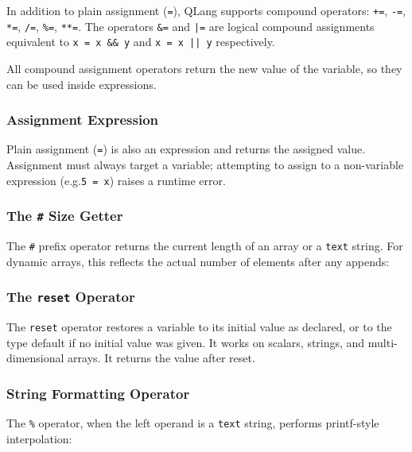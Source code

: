 In addition to plain assignment (\texttt{=}), QLang supports compound
operators: \texttt{+=}, \texttt{-=}, \texttt{*=}, \texttt{/=}, \texttt{\%=},
\texttt{**=}. The operators \texttt{\&=} and \texttt{|=} are logical compound
assignments equivalent to \texttt{x = x \&\& y} and \texttt{x = x || y}
respectively.

All compound assignment operators return the new value of the variable,
so they can be used inside expressions.

\subsubsection{Assignment Expression}

Plain assignment (\texttt{=}) is also an expression and returns the assigned
value. Assignment must always target a variable; attempting to assign to a
non-variable expression (e.g.\@ \texttt{5 = x}) raises a runtime error.

\subsubsection{The \texttt{\#} Size Getter}

The \texttt{\#} prefix operator returns the current length of an array or a
\texttt{text} string. For dynamic arrays, this reflects the actual number of
elements after any appends:



\newpage
\subsubsection{The \texttt{reset} Operator}

The \texttt{reset} operator restores a variable to its initial value as
declared, or to the type default if no initial value was given. It works on
scalars, strings, and multi-dimensional arrays. It returns the value after
reset.



\subsubsection{String Formatting Operator}

The \texttt{\%} operator, when the left operand is a \texttt{text} string,
performs printf-style interpolation:



